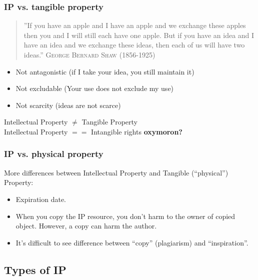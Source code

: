 \documentclass{beamer}
\begin{document}

\begin{frame}
\frametitle{IP vs. tangible property}

\begin{quote}
\footnotesize{''If you have an apple and I have an apple and we exchange these apples then you and I will still each have one apple. But if you have an idea and I have an idea and we exchange these ideas, then each of us will have two ideas.''} \textsc{George Bernard Shaw} (1856-1925)
\end{quote}

\pause

\begin {itemize}
\item Not antagonistic (if I take your idea, you still maintain it) 
\item Not excludable (Your use does not exclude my use)
\item Not scarcity (ideas are not scarce)
\end{itemize}
\begin{center}
\pause
Intellectual Property $\neq$ Tangible Property \\
\pause
Intellectual Property $==$ \alert{Intangible rights} \textbf{oxymoron?}
\end{center}
\end{frame}


\begin{frame}
\frametitle{IP vs. physical property}

More differences between Intellectual Property and Tangible (``physical'')
Property:
\begin{itemize}
\item Expiration date.
\item When you copy the IP resource, you don't harm to the owner of
  copied object. However, a copy can harm the author.
\item It's difficult to see difference between ``copy'' (plagiarism) and
``inspiration''. 
\end{itemize}

\end{frame}


\subsection{Types of IP}
\end{document}
